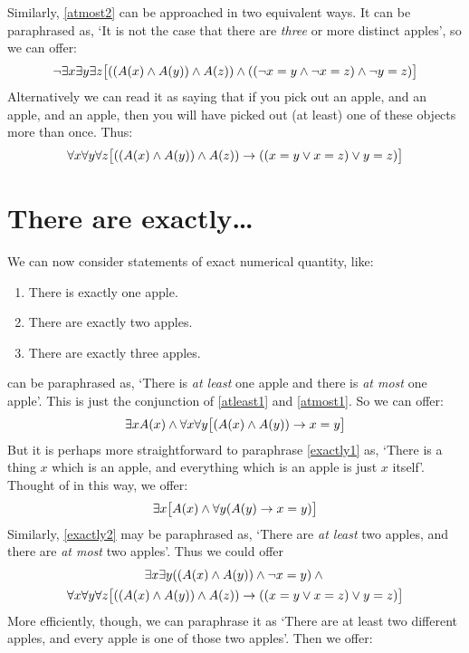 Similarly, \cref*{atmost2} can be approached in two equivalent ways. It can be paraphrased as, `It is not the case that there are \emph{three} or more distinct apples', so we can offer:
$$\neg \exists x \exists y\exists z\bigl[((A(x) \wedge A(y)) \wedge A(z)) \wedge ((\neg x = y \wedge \neg x = z) \wedge \neg y = z)\bigr]$$
Alternatively we can read it as saying that if you pick out an apple, and an apple, and an apple, then you will have picked out (at least) one of these objects more than once. Thus:
$$\forall x\forall y\forall z\bigl[((A(x) \wedge A(y)) \wedge A(z)) \rightarrow ((x=y \vee x=z) \vee y=z)\bigr]$$


\section{There are exactly\ldots}\label{sec:exactlyn}
We can now consider statements of exact numerical quantity, like:
\begin{enumerate}
\item\label{exactly1} There is exactly one apple.
\item\label{exactly2} There are exactly two apples.
\item\label{exactly3} There are exactly three apples.
\end{enumerate}
 can be paraphrased as, `There is \emph{at least} one apple and there is \emph{at most} one apple'. This is just the conjunction of \cref*{atleast1} and \cref{atmost1}. So we can offer:
$$\exists x A(x) \wedge \forall x\forall y\bigl[(A(x) \wedge A(y)) \rightarrow x=y\bigr]$$
But it is perhaps more straightforward to paraphrase \cref*{exactly1} as, `There is a thing $x$ which is an apple, and everything which is an apple is just $x$ itself'. Thought of in this way, we offer: 
\[
	\exists x\bigl[A(x) \wedge \forall y(A(y) \rightarrow x= y)\bigr]
\]
Similarly, \cref*{exactly2} may be paraphrased as, `There are \emph{at least} two apples, and there are \emph{at most} two apples'. Thus we could offer 
\begin{multline*}
  \exists x \exists y((A(x) \wedge A(y)) \wedge \neg x = y) \wedge {}\\
  \forall x\forall y\forall z\bigl[((A(x) \wedge A(y)) \wedge A(z)) \rightarrow ((x=y \vee x=z) \vee y=z)\bigr]
\end{multline*}
More efficiently, though, we can paraphrase it as `There are at least two different apples, and every apple is one of those two apples'. Then we offer:
